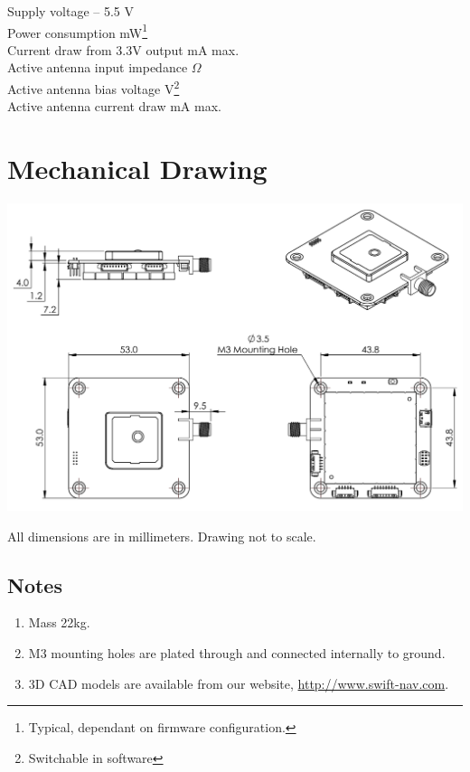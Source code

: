 \documentclass{article}
\newenvironment{mpar}{\par\noindent\minipage{\linewidth}}{\endminipage\par}
\begin{document}
\begin{mpar}
\begin{multicols}{2}
  \noindent
  Supply voltage  -- 5.5 V \\
  Power consumption  mW\footnote{Typical, dependant on firmware configuration.} \\
  Current draw from 3.3V output  mA max.\\
  Active antenna input impedance  $\Omega$ \\
  Active antenna bias voltage  V\footnote{Switchable in software}\\
  Active antenna current draw  mA max.
\end{multicols}
\end{mpar}

\section*{Mechanical Drawing}
\begin{center}
  \includegraphics[scale=0.75]{swiftnav_v2_2_mechanical.pdf}
\end{center}

All dimensions are in millimeters. Drawing not to scale.

\subsection*{Notes}
\begin{enumerate}
  \item Mass 22kg.
  \item M3 mounting holes are plated through and connected internally to ground.
  \item 3D CAD models are available from our website, \url{http://www.swift-nav.com}.
\end{enumerate}
\end{document}
